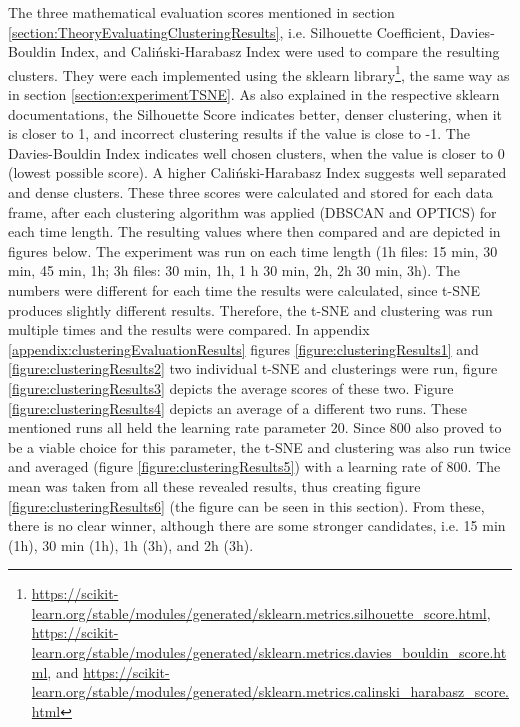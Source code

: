 
The three mathematical evaluation scores mentioned in section \ref{section:TheoryEvaluatingClusteringResults}, i.e. Silhouette Coefficient, Davies-Bouldin Index, and Caliński-Harabasz Index were used to compare the resulting clusters.  They were each implemented using the sklearn library\footnote{\url{https://scikit-learn.org/stable/modules/generated/sklearn.metrics.silhouette_score.html}, \url{https://scikit-learn.org/stable/modules/generated/sklearn.metrics.davies_bouldin_score.html}, and \url{https://scikit-learn.org/stable/modules/generated/sklearn.metrics.calinski_harabasz_score.html}}, the same way as in section \ref{section:experimentTSNE}.
As also explained in the respective sklearn documentations, the Silhouette Score indicates better, denser clustering, when it is closer to 1, and incorrect clustering results if the value is close to -1. The Davies-Bouldin Index indicates well chosen clusters, when the value is closer to 0 (lowest possible score). A higher Caliński-Harabasz Index suggests well separated and dense clusters.
These three scores were calculated and stored for each data frame, after each clustering algorithm was applied (DBSCAN and OPTICS) for each time length. The resulting values where then compared and are depicted in figures below. 
The experiment was run on each time length (1h files: 15 min, 30 min, 45 min, 1h; 3h files: 30 min, 1h, 1 h 30 min, 2h, 2h 30 min, 3h).
The numbers were different for each time the results were calculated, since t-SNE produces slightly different results. Therefore, the t-SNE and clustering was run multiple times and the results were compared. In appendix \ref{appendix:clusteringEvaluationResults} figures \ref{figure:clusteringResults1} and \ref{figure:clusteringResults2} two individual t-SNE and clusterings were run, figure \ref{figure:clusteringResults3} depicts the average scores of these two. Figure \ref{figure:clusteringResults4} depicts an average of a different two runs. These mentioned runs all held the learning rate parameter 20. Since 800 also proved to be a viable choice for this parameter, the t-SNE and clustering was also run twice and averaged (figure \ref{figure:clusteringResults5}) with a learning rate of 800. The mean was taken from all these revealed results, thus creating figure \ref{figure:clusteringResults6} (the figure can be seen in this section). From these, there is no clear winner, although there are some stronger candidates, i.e. 15 min (1h), 30 min (1h), 1h (3h), and 2h (3h). 


